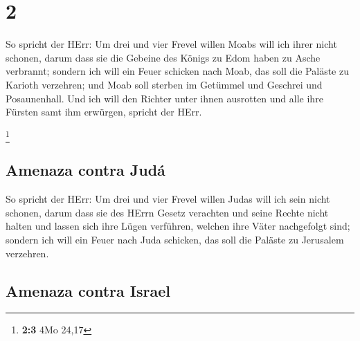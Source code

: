 \hypertarget{section-1}{%
\section{2}\label{section-1}}

 So spricht der HErr: Um drei und vier Frevel willen Moabs
will ich ihrer nicht schonen, darum dass sie die Gebeine des Königs zu
Edom haben zu Asche verbrannt;  sondern ich will ein Feuer
schicken nach Moab, das soll die Paläste zu Karioth verzehren; und Moab
soll sterben im Getümmel und Geschrei und Posaunenhall. 
Und ich will den Richter unter ihnen ausrotten und alle ihre Fürsten
samt ihm erwürgen, spricht der HErr.

\footnote{\textbf{2:3} 4Mo 24,17}

\hypertarget{amenaza-contra-juduxe1}{%
\subsection{Amenaza contra Judá}\label{amenaza-contra-juduxe1}}

 So spricht der HErr: Um drei und vier Frevel willen Judas
will ich sein nicht schonen, darum dass sie des HErrn Gesetz verachten
und seine Rechte nicht halten und lassen sich ihre Lügen verführen,
welchen ihre Väter nachgefolgt sind;  sondern ich will ein
Feuer nach Juda schicken, das soll die Paläste zu Jerusalem verzehren.

\hypertarget{amenaza-contra-israel}{%
\subsection{Amenaza contra Israel}\label{amenaza-contra-israel}}

